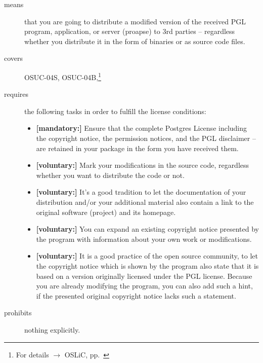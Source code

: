 \begin{description}

\item[means] that you are going to distribute a modified version of the received
PGL program, application, or server (proapse) to 3rd parties -- regardless
whether you distribute it in the form of binaries or as source code files.
\item[covers] OSUC-04S, OSUC-04B,\footnote{For details $\rightarrow$ OSLiC, pp.\
\pageref{OSUC-04S-DEF}} 

\item[requires] the following tasks in order to fulfill the license conditions:
\begin{itemize}
  \item \textbf{[mandatory:]} Ensure that the complete Postgres License
  including the copyright notice, the permission notices, and the PGL disclaimer
  -- are retained in your package in the form you have received them.
  \item \textbf{[voluntary:]} Mark your modifications in the source code,
  regardless whether you want to distribute the code or not.
  \item \textbf{[voluntary:]} It's a good tradition to let the documentation of
  your distribution and/or your additional material also contain a link to the
  original software (project) and its homepage.
  \item \textbf{[voluntary:]} You can expand an existing copyright notice
  presented by the program with information about your own work or
  modifications.
  \item \textbf{[voluntary:]} It is a good practice of the open source
  community, to let the copyright notice which is shown by the program also
  state that it is based on a version originally licensed under the PGL license.
  Because you are already modifying the program, you can also add such a hint,
  if the presented original copyright notice lacks such a statement.
\end{itemize}

\item[prohibits] nothing explicitly.

\end{description}

